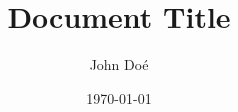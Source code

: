 \documentclass{scrreprt}
\author{John Doé}
\title{Document Title}
\date{\today}
\begin{document}
\maketitle
\tableofcontents

\Blinddocument
\end{document}
